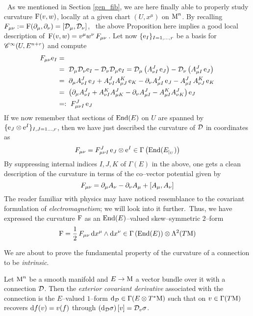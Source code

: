 \,\newline
As we mentioned in Section \ref{gen_fib}, we are here finally able to properly study curvature $\text{\normalfont F}(v,w)$, locally at a given chart $(U,x^\mu)$ on $\text{\normalfont M}^n$. By recalling $F_{\mu\nu}:=\text{\normalfont F}(\partial_\mu,\partial_\nu)=[\mathcal{D}_\mu,\mathcal{D}_\nu]$,%
\, the above Proposition here implies a good local description of \,$\text{\normalfont F}(v,w)=v^\mu w^\nu\,F_{\mu\nu}$\,. Let now $\{\text{\normalfont e}_I\}_{I=1,\hdots,r}$ be a basis for $\mathscr{C}^\infty(U,E^{n+r})$ and compute
\begin{align*}
    F_{\mu\nu}\text{\normalfont e}_I&=\\
    &=\,\,\mathcal{D}_\mu\mathcal{D}_\nu\text{\normalfont e}_I-\mathcal{D}_\nu\mathcal{D}_\mu\text{\normalfont e}_I=\mathcal{D}_\mu\left( A_{\nu I}^J\,\text{\normalfont e}_J\right)-\mathcal{D}_\nu\left( A_{\mu I}^J\,\text{\normalfont e}_J\right)\\
    &=\,\,\partial_\mu A^J_{\nu I}\,\text{\normalfont e}_J+ A^J_{\nu I} A_{\mu J}^K\,\text{\normalfont e}_K-\partial_\nu A_{\mu I}^J\,\text{\normalfont e}_J- A^J_{\mu I}\, A^K_{\nu J}\,\text{\normalfont e}_K\\
    &=\,\,\left(\partial_\mu A^J_{\nu I}+ A^K_{\nu I} A^J_{\mu K}-\partial_\nu A^J_{\mu I}- A^K_{\mu I} A_{\nu K}^J\right)\text{\normalfont e}_J\\
    &=:\,\,F_{\mu\nu I}^J\,\text{\normalfont e}_J
\end{align*}
If we now remember that sections of $\text{\normalfont End}(E)$ on $U$ are spanned by $\{\text{\normalfont e}_J\otimes\text{\normalfont e}^I\}_{I,J=1\hdots,r}$, then we have just described the curvature of $\mathcal{D}$ in coordinates as
$$F_{\mu\nu}=F^J_{\mu\nu I}\,\text{\normalfont e}_J\otimes\text{\normalfont e}^I\in\Gamma\left(\text{\normalfont End}(E_{|_U})\right)$$
By suppressing internal indices $I,J,K$ of $\Gamma(E)$ in the above, one gets a clean description of the curvature in terms of the co--vector potential given by
$$F_{\mu\nu}=\partial_\mu A_\nu-\partial_\nu A_\mu+[ A_\mu, A_\nu]$$
The reader familiar with physics may have noticed resemblance to the covariant formulation of \emph{electromagnetism}; we will look into it further.\, Thus, we have expressed the curvature $\text{\normalfont F}$ as an $\text{\normalfont End}(E)$--valued skew--symmetric $2$--form 
$$\text{\normalfont F}=\frac{1}{2}\,F_{\mu\nu}\,\text{\normalfont d} x^\mu\wedge\text{\normalfont d} x^\nu\in\Gamma\left(\text{\normalfont End}(E)\right)\otimes\Lambda^2(T\text{\normalfont M})$$

We are about to prove the fundamental property of the curvature of a connection to be \emph{intrinsic}.

\begin{defi}
    Let $\text{\normalfont M}^n$ be a smooth manifold and $E\to\text{\normalfont M}$ a vector bundle over it with a connection $\mathcal{D}$. Then the \emph{exterior covariant derivative} associated with the connection is the $E$--valued $1$--form $\text{\normalfont d}_{\mathcal{D}}\in\Gamma(E\otimes T^*\text{\normalfont M})$ such that on $v\in\Gamma(T\text{\normalfont M})$ recovers $\text{\normalfont d} f(v)=v(f)$ through $\left(\text{\normalfont d}_{\mathcal{D}} \sigma\right)[v]=\mathcal{D}_v\sigma$.
\end{defi}

